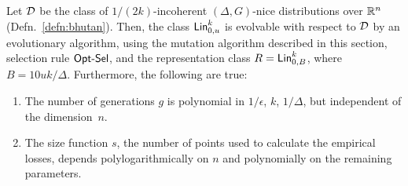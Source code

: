 \begin{theorem} \label{thm:greedy} Let ${\mathcal D}$ be the class of
$1/(2k)$-incoherent $(\Delta, G)$-nice distributions over $\mathbb{R}^n$
(Defn.~\ref{defn:bhutan}).
Then, the class $\mathsf{Lin}^k_{0, u}$ is evolvable with respect to ${\mathcal D}$ by an
evolutionary algorithm, using the mutation algorithm described in this section,
selection rule $\mathsf{Opt\mbox{-}Sel}$, and the representation class $R = \mathsf{Lin}^k_{0, B}$,
where $B = 10 uk/\Delta$.  Furthermore, the following are true:
\begin{enumerate}
%
\item The number of generations $g$ is polynomial in $1/\epsilon$, $k$,
$1/\Delta$, but independent of the dimension~$n$.
%
\item The size function $s$, the number of points used to calculate the
empirical losses, depends polylogarithmically on $n$ and polynomially on the
remaining parameters.
\end{enumerate}
\end{theorem}
